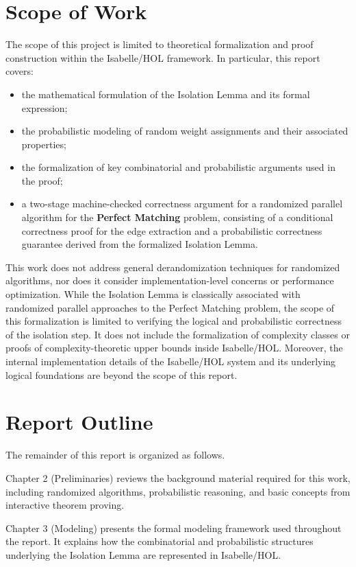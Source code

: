 \section{Scope of Work}
The scope of this project is limited to theoretical formalization and proof construction within the Isabelle/HOL framework.
In particular, this report covers:
\begin{itemize}
    \item the mathematical formulation of the Isolation Lemma and its formal expression;
    \item the probabilistic modeling of random weight assignments and their associated properties;
    \item the formalization of key combinatorial and probabilistic arguments used in the proof;
    \item a two-stage machine-checked correctness argument for a randomized parallel algorithm for the \textbf{Perfect Matching} problem, consisting of a conditional correctness proof for the edge extraction and a probabilistic correctness guarantee derived from the formalized Isolation Lemma.
\end{itemize}

This work does not address general derandomization techniques for randomized algorithms, nor does it consider implementation-level concerns or performance optimization.
While the Isolation Lemma is classically associated with randomized parallel approaches to the Perfect Matching problem, the scope of this formalization is limited to verifying the logical and probabilistic correctness of the isolation step.
It does not include the formalization of complexity classes or proofs of complexity-theoretic upper bounds inside Isabelle/HOL.
Moreover, the internal implementation details of the Isabelle/HOL system and its underlying logical foundations are beyond the scope of this report.

\section{Report Outline}

The remainder of this report is organized as follows.

Chapter 2 (Preliminaries) reviews the background material required for this work, including randomized algorithms, probabilistic reasoning, and basic concepts from interactive theorem proving.

Chapter 3 (Modeling) presents the formal modeling framework used throughout the report.
It explains how the combinatorial and probabilistic structures underlying the Isolation Lemma are represented in Isabelle/HOL.

